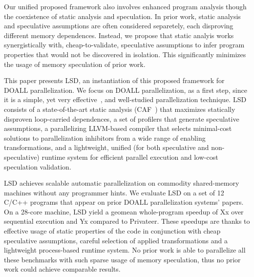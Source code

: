 Our unified proposed framework also involves enhanced program analysis though
the coexistence of static analysis and speculation. In prior work, static
analysis and speculative assumptions are often considered separetely, each
disproving different memory dependences. Instead, we propose that static analyis
works synergistically with, cheap-to-validate, speculative assumptions to infer
program properties that would not be discovered in isolation. This significantly
minimizes the usage of memory speculation of prior work.




This paper presents LSD, an instantiation of this proposed framework for DOALL
parallelization. We focus on DOALL parallelization, as a first step, since it is
a simple, yet very effective~\cite{zhong:08:hpca}, and well-studied
parallelization technique.
LSD consists of a state-of-the-art static analysis (CAF~\cite{CAF, }) that
maximizes statically disproven loop-carried dependences, a set of profilers that
generate speculative assumptions, a parallelizing LLVM-based compiler that
selects minimal-cost solutions to parallelization inhibitors from a wide range
of enabling transformations, and a lightweight, unified (for both speculative
and non-speculative) runtime system for efficient parallel execution and
low-cost speculation validation.
%

LSD achieves scalable automatic parallelization on commodity shared-memory
machines without any programmer hints.  We evaluate LSD on a set of 12 C/C++
programs that appear on prior DOALL parallelization systems' papers. On a
28-core machine, LSD yield a geomean whole-program speedup of Xx over sequential
execution and Yx compared to Privateer.
These speedups are thanks to effective usage of static properties of the code in
conjunction with cheap speculative assumptions, careful selection of applied
transformations and a lightweight process-based runtime system.  No prior work
is able to parallelize all these benchmarks with such sparse usage of memory
speculation, thus no prior work could achieve comparable results.
